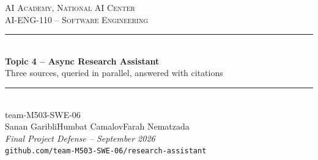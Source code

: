 \documentclass[aspectratio=169,11pt]{beamer}
\newcommand{\teamname}{team-M503-SWE-06}
\newcommand{\topicchoice}{Topic 4 -- Async Research Assistant}
\newcommand{\memberone}{Sanan Garibli}
\newcommand{\membertwo}{Humbat Camalov}
\newcommand{\memberthree}{Farah Nematzada}
\newcommand{\repolink}{github.com/team-M503-SWE-06/research-assistant}
\newcommand{\coursecode}{AI-ENG-110}
\newcommand{\coursename}{Software Engineering}
\newcommand{\institution}{AI Academy, National AI Center}
\begin{document}
{%
\begin{frame}[plain]
  \begin{center}
    \vspace{0.6cm}
    {\small \textsc{\institution}}\\[0.2em]
    {\small \textsc{\coursecode{} -- \coursename{}}}\\[1.2em]
    \rule{0.7\textwidth}{0.6pt}\\[0.4em]
    {\Huge\bfseries\color{accent} \topicchoice}\\[0.3em]
    {\normalsize Three sources, queried in parallel, answered with citations}\\[0.4em]
    \rule{0.7\textwidth}{0.6pt}\\[1.0em]
    {\large \teamname}\\[0.6em]
    {\normalsize \memberone\quad\textbullet\quad\membertwo\quad\textbullet\quad\memberthree}\\[0.9cm]
    {\footnotesize\itshape Final Project Defense -- September 2026}\\[0.4em]
    {\footnotesize\texttt{\repolink}}
  \end{center}
\end{frame}
}
\end{document}

